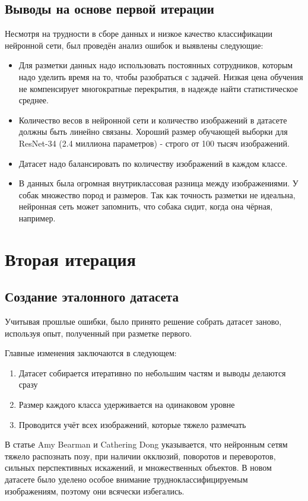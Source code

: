 \subsection{Выводы на основе первой итерации}
Несмотря на трудности в сборе данных и низкое качество классификации нейронной сети, был проведён анализ ошибок и выявлены следующие:
\begin{itemize}
    \item Для разметки данных надо использовать постоянных сотрудников, которым надо уделить время на то, чтобы разобраться с задачей. Низкая цена обучения не компенсирует многократные перекрытия, в надежде найти статистическое среднее.
    \item Количество весов в нейронной сети и количество изображений в датасете должны быть линейно связаны. Хороший размер обучающей выборки для ResNet-34 (2.4 миллиона параметров) - строго от 100 тысяч изображений.
    \item Датасет надо балансировать по количеству изображений в каждом классе.
    \item В данных была огромная внутриклассовая разница между изображениями. У собак множество пород и размеров. Так как точность разметки не идеальна, нейронная сеть может запомнить, что собака сидит, когда она чёрная, например. 
\end{itemize}{}

\section{Вторая итерация}

\subsection{Создание эталонного датасета} \label{subsect3_1_2}
Учитывая прошлые ошибки, было принято решение собрать датасет заново, используя опыт, полученный при разметке первого.

Главные изменения заключаются в следующем:
\begin{enumerate}
    \item Датасет собирается итеративно по небольшим частям и выводы делаются сразу
    \item Размер каждого класса удерживается на одинаковом уровне
    \item Проводится учёт всех изображений, которые тяжело размечать
\end{enumerate}{}

В статье Amy Bearman и Cathering Dong \cite{Bearman2015HumanPE} указывается, что нейронным сетям тяжело распознать позу, при наличии окклюзий, поворотов и переворотов, сильных перспективных искажений, и множественных объектов. В новом датасете было уделено особое внимание трудноклассифицируемым изображениям, поэтому они всячески избегались.

